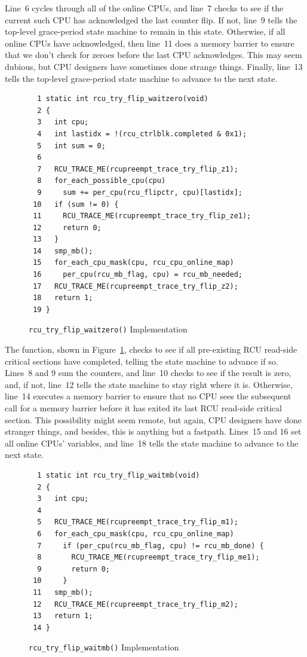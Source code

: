 Line~6 cycles through all of the online CPUs, and line~7
checks to see if the current such CPU has acknowledged the last counter
flip.
If not, line~9 tells the top-level grace-period state machine to
remain in this state.
Otherwise, if all online CPUs have acknowledged, then line~11
does a memory barrier to ensure that we don't check for zeroes before
the last CPU acknowledges.
This may seem dubious, but CPU designers have sometimes done strange
things.
Finally, line~13 tells the top-level grace-period state machine
to advance to the next state.

\begin{figure}[tbp]
{ \scriptsize
\begin{verbatim}
  1 static int rcu_try_flip_waitzero(void)
  2 {
  3   int cpu;
  4   int lastidx = !(rcu_ctrlblk.completed & 0x1);
  5   int sum = 0;
  6
  7   RCU_TRACE_ME(rcupreempt_trace_try_flip_z1);
  8   for_each_possible_cpu(cpu)
  9     sum += per_cpu(rcu_flipctr, cpu)[lastidx];
 10   if (sum != 0) {
 11     RCU_TRACE_ME(rcupreempt_trace_try_flip_ze1);
 12     return 0;
 13   }
 14   smp_mb();
 15   for_each_cpu_mask(cpu, rcu_cpu_online_map)
 16     per_cpu(rcu_mb_flag, cpu) = rcu_mb_needed;
 17   RCU_TRACE_ME(rcupreempt_trace_try_flip_z2);
 18   return 1;
 19 }
\end{verbatim}
}
\caption{{\tt rcu\_try\_flip\_waitzero()} Implementation}
\label{fig:app:rcuimpl:rcu_try_flip_waitzero() Implementation}
\end{figure}

The  function, shown in
Figure~\ref{fig:app:rcuimpl:rcu_try_flip_waitzero() Implementation},
checks to see if
all pre-existing RCU read-side critical sections have completed,
telling the state machine to advance if so.
Lines~8 and 9 sum the counters, and line~10 checks
to see if the result is zero, and, if not, line~12 tells
the state machine to stay right where it is.
Otherwise, line~14 executes a memory barrier to ensure that
no CPU sees the subsequent call for a memory barrier before it
has exited its last RCU read-side critical section.
This possibility might seem remote, but again, CPU designers have
done stranger things, and besides, this is anything but a fastpath.
Lines~15 and 16 set all online CPUs' 
variables, and line~18 tells the state machine to advance to
the next state.

\begin{figure}[tbp]
{ \scriptsize
\begin{verbatim}
  1 static int rcu_try_flip_waitmb(void)
  2 {
  3   int cpu;
  4
  5   RCU_TRACE_ME(rcupreempt_trace_try_flip_m1);
  6   for_each_cpu_mask(cpu, rcu_cpu_online_map)
  7     if (per_cpu(rcu_mb_flag, cpu) != rcu_mb_done) {
  8       RCU_TRACE_ME(rcupreempt_trace_try_flip_me1);
  9       return 0;
 10     }
 11   smp_mb();
 12   RCU_TRACE_ME(rcupreempt_trace_try_flip_m2);
 13   return 1;
 14 }
\end{verbatim}
}
\caption{{\tt rcu\_try\_flip\_waitmb()} Implementation}
\label{fig:app:rcuimpl:rcu_try_flip_waitmb() Implementation}
\end{figure}

